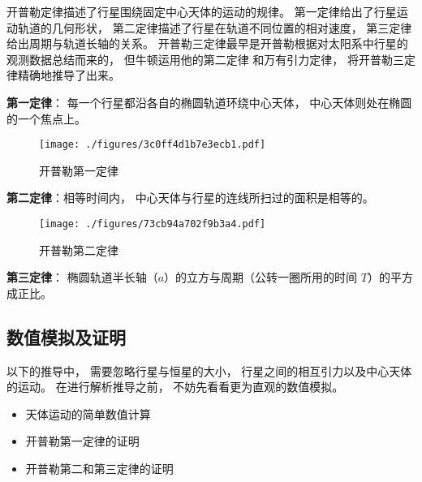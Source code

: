 

开普勒定律描述了行星围绕固定中心天体的运动的规律。 第一定律给出了行星运动轨道的几何形状， 第二定律描述了行星在轨道不同位置的相对速度， 第三定律给出周期与轨道长轴的关系。 开普勒三定律最早是开普勒根据对太阳系中行星的观测数据总结而来的， 但牛顿运用他的第二定律 和万有引力定律， 将开普勒三定律精确地推导了出来。

\textbf{第一定律}： 每一个行星都沿各自的椭圆轨道环绕中心天体， 中心天体则处在椭圆的一个焦点上。
\begin{figure}[ht]
\centering
\texttt{[image: ./figures/3c0ff4d1b7e3ecb1.pdf]}
\caption{开普勒第一定律} \label{fig_Keple_1}
\end{figure}

\textbf{第二定律}：相等时间内， 中心天体与行星的连线所扫过的面积是相等的。
\begin{figure}[ht]
\centering
\texttt{[image: ./figures/73cb94a702f9b3a4.pdf]}
\caption{开普勒第二定律} \label{fig_Keple_2}
\end{figure}

\textbf{第三定律}： 椭圆轨道半长轴（$a$）的立方与周期（公转一圈所用的时间 $T$）的平方成正比。

\subsection{数值模拟及证明}

以下的推导中， 需要忽略行星与恒星的大小， 行星之间的相互引力以及中心天体的运动。 在进行解析推导之前， 不妨先看看更为直观的数值模拟。
 
\begin{itemize}
\item 天体运动的简单数值计算
\item 开普勒第一定律的证明
\item 开普勒第二和第三定律的证明
\end{itemize}
 
